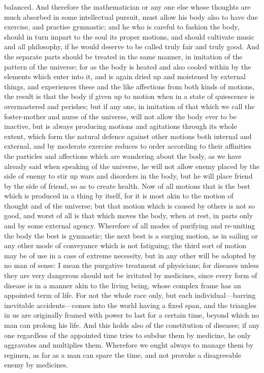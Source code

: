 balanced. And therefore the mathematician or any one else whose thoughts
are much absorbed in some intellectual pursuit, must allow his body also
to have due exercise, and practise gymnastic; and he who is careful to
fashion the body, should in turn impart to the soul its proper motions,
and should cultivate music and all philosophy, if he would deserve to be
called truly fair and truly good. And the separate parts should be treated
in the same manner, in imitation of the pattern of the universe; for as
the body is heated and also cooled within by the elements which enter into
it, and is again dried up and moistened by external things, and
experiences these and the like affections from both kinds of motions, the
result is that the body if given up to motion when in a state of
quiescence is overmastered and perishes; but if any one, in imitation of
that which we call the foster-mother and nurse of the universe, will not
allow the body ever to be inactive, but is always producing motions and
agitations through its whole extent, which form the natural defence
against other motions both internal and external, and by moderate exercise
reduces to order according to their affinities the particles and
affections which are wandering about the body, as we have already said
when speaking of the universe, he will not allow enemy placed by the side
of enemy to stir up wars and disorders in the body, but he will place
friend by the side of friend, so as to create health. Now of all motions
that is the best which is produced in a thing by itself, for it is most
akin to the motion of thought and of the universe; but that motion which
is caused by others is not so good, and worst of all is that which moves
the body, when at rest, in parts only and by some external agency.
Wherefore of all modes of purifying and re-uniting the body the best is
gymnastic; the next best is a surging motion, as in sailing or any other
mode of conveyance which is not fatiguing; the third sort of motion may be
of use in a case of extreme necessity, but in any other will be adopted by
no man of sense: I mean the purgative treatment of physicians; for
diseases unless they are very dangerous should not be irritated by
medicines, since every form of disease is in a manner akin to the living
being, whose complex frame has an appointed term of life. For not the
whole race only, but each individual—barring inevitable accidents—comes
into the world having a fixed span, and the triangles in us are originally
framed with power to last for a certain time, beyond which no man can
prolong his life. And this holds also of the constitution of diseases; if
any one regardless of the appointed time tries to subdue them by medicine,
he only aggravates and multiplies them. Wherefore we ought always to
manage them by regimen, as far as a man can spare the time, and not
provoke a disagreeable enemy by medicines.

